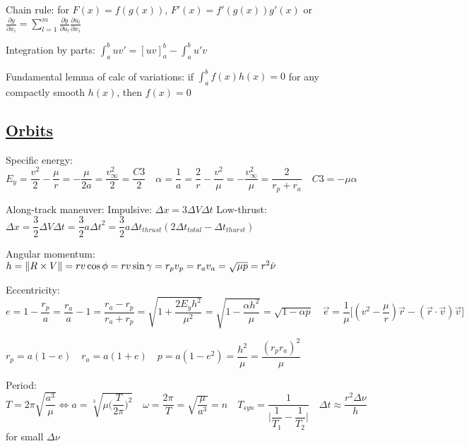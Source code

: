\documentclass[11pt,landscape]{article}
\begin{document}
Chain rule: for $F(x)=f(g(x))$, $F'(x)=f'(g(x))g'(x)$
or $\frac{\partial y}{\partial x_i} = 
\sum_{l=1}^{m} \frac{\partial y}{\partial u_l}\frac{\partial u_l}{\partial x_i}$

Integration by parts: $\int_{a}^{b} u v' = [uv]_{a}^{b} - \int_{a}^{b} u'v$

Fundamental lemma of calc of variations:
if $\int_{a}^{b}f(x)h(x) = 0$ for any compactly smooth $h(x)$, then $f(x)=0$




\newpage
\subsection{\underline{Orbits}}

\begin{wrapfigure}{r}{0.25\textwidth}
\end{wrapfigure}

Specific energy:
$
E_y 
= \dfrac{v^2}{2} - \dfrac{\mu}{r} 
= -\dfrac{\mu}{2a} 
= \dfrac{v_{\infty}^2}{2} 
= \dfrac{C3}{2}
\quad
\alpha
= \dfrac{1}{a}
= \dfrac{2}{r} - \dfrac{v^2}{\mu}
= -\dfrac{v_{\infty}^2}{\mu}
= \dfrac{2}{r_p+r_a}
\quad
C3 = -\mu\alpha
$

Along-track maneuver:
\quad
Impulsive:
$\Delta x = 3 \Delta V \Delta t$
\quad
Low-thrust:
$
\Delta x 
= \dfrac{3}{2} \Delta V \Delta t 
= \dfrac{3}{2} a {\Delta t}^2
= \dfrac{3}{2} a \Delta t_{thrust} ( 2\Delta t_{total} - \Delta t_{thurst} )
$

Angular momentum:
$
h
=\left\lVert R \times V \right\rVert
=rv \cos \phi
=rv \sin \gamma
=r_p v_p
=r_a v_a
=\sqrt{\mu p}
=r^2 \dot{\nu}
$

Eccentricity:
$
e 
=1-\dfrac{r_p}{a}
=\dfrac{r_a}{a}-1
=\dfrac{r_a-r_p}{r_a+r_p}
=\sqrt{1+\dfrac{2 E_y h^2}{\mu^2}}
=\sqrt{1-\dfrac{\alpha h^2}{\mu}}
=\sqrt{1-\alpha p}
\quad
\vec{e} = \dfrac{1}{\mu} 
\big[ (v^2-\dfrac{\mu}{r})\vec{r} - (\vec{r} \cdot \vec{v})\vec{v} \big]
$

$
r_p = a(1-e)
\quad
r_a = a(1+e)
\quad
p 
= a(1-e^2)
= \dfrac{h^2}{\mu}
= \dfrac{(r_p r_a)^2}{\mu}
$

Period:
$
T=2\pi\sqrt{\dfrac{a^3}{\mu}}
\Leftrightarrow
a = \sqrt[3]{\mu \big( \dfrac{T}{2\pi} \big)^2} 
\quad
\omega 
= \dfrac{2\pi}{T}
= \sqrt{\dfrac{\mu}{a^3}}
= n
\quad
T_{syn}=\dfrac{1}{\big| \dfrac{1}{T_1} - \dfrac{1}{T_2} \big|}
\quad
\Delta t \approx \dfrac{r^2 \Delta\nu}{h}$ for small $\Delta\nu$
\end{document}
